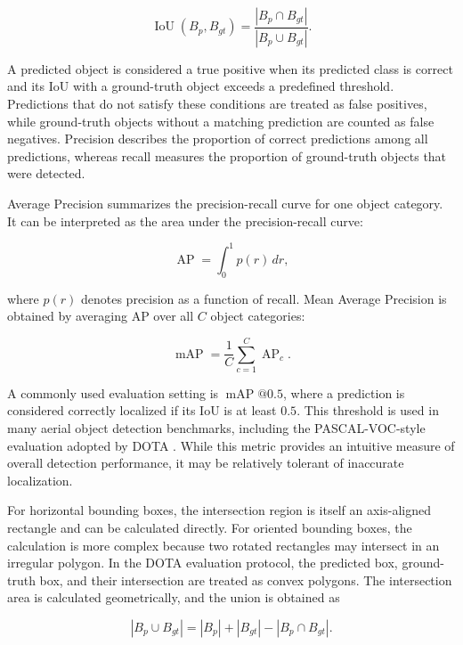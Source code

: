 \begin{equation}
    \operatorname{IoU}(B_p,B_{gt})
    =
    \frac{|B_p \cap B_{gt}|}
         {|B_p \cup B_{gt}|}.
\end{equation}

A predicted object is considered a true positive when its predicted class is correct and its IoU with a ground-truth object exceeds a predefined threshold. Predictions that do not satisfy these conditions are treated as false positives, while ground-truth objects without a matching prediction are counted as false negatives. Precision describes the proportion of correct predictions among all predictions, whereas recall measures the proportion of ground-truth objects that were detected.

Average Precision summarizes the precision-recall curve for one object category. It can be interpreted as the area under the precision-recall curve:

\begin{equation}
    \operatorname{AP}
    =
    \int_0^1 p(r)\,dr,
\end{equation}

where $p(r)$ denotes precision as a function of recall. Mean Average Precision is obtained by averaging AP over all $C$ object categories:

\begin{equation}
    \operatorname{mAP}
    =
    \frac{1}{C}
    \sum_{c=1}^{C} \operatorname{AP}_c.
\end{equation}

A commonly used evaluation setting is $\operatorname{mAP}@0.5$, where a prediction is considered correctly localized if its IoU is at least $0.5$. This threshold is used in many aerial object detection benchmarks, including the PASCAL-VOC-style evaluation adopted by DOTA \cite{ding2021object}. While this metric provides an intuitive measure of overall detection performance, it may be relatively tolerant of inaccurate localization.

For horizontal bounding boxes, the intersection region is itself an axis-aligned rectangle and can be calculated directly. For oriented bounding boxes, the calculation is more complex because two rotated rectangles may intersect in an irregular polygon. In the DOTA evaluation protocol, the predicted box, ground-truth box, and their intersection are treated as convex polygons. The intersection area is calculated geometrically, and the union is obtained as

\begin{equation}
    |B_p \cup B_{gt}|
    =
    |B_p| + |B_{gt}| - |B_p \cap B_{gt}|.
\end{equation}

